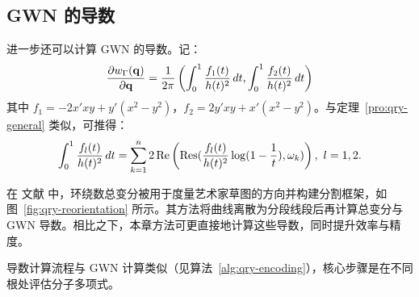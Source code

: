 \subsection{GWN 的导数}\label{sec:qry-derivative}
进一步还可以计算 GWN 的导数。记：
\begin{equation}
    \frac{\partial w_{\Gamma}(\mathbf{q})}{\partial \mathbf{q}}=\frac{1}{2 \pi} \left(\int_0^1\frac{f_1(t)}{h(t)^2}\,dt,\int_0^1\frac{f_2(t)}{h(t)^2}\,dt\right)
\end{equation}
其中 $f_1 =-2 x' x y +y' (x ^2-y ^2)$，$f_2 =2y' x y +x' (x ^2-y ^2)$。与定理~\ref{pro:qry-general} 类似，可推得：
\begin{equation}
    \int_0^1\frac{f_l(t)}{h(t)^2}\,dt=\sum_{k=1}^n2\mathop{\mathrm{Re}}\left(\mathop{\mathrm{Res}}(\frac{f_l(t)}{h(t)^2}\log(1-\frac{1}{t}),\omega_k)\right),\  l=1,2.
\end{equation}

在 文献\cite{Scrivener2024WindingNF} 中，环绕数总变分被用于度量艺术家草图的方向并构建分割框架，如图~\ref{fig:qry-reorientation} 所示。其方法将曲线离散为分段线段后再计算总变分与 GWN 导数。相比之下，本章方法可更直接地计算这些导数，同时提升效率与精度。

导数计算流程与 GWN 计算类似（见算法~\ref{alg:qry-encoding}），核心步骤是在不同根处评估分子多项式。


\begin{algorithm}[t]
  \caption{WindingNumber\Bezier：计算任意 \Bezier 曲线的广义环绕数}\label{alg:qry-encoding}
  

\end{algorithm}

\begin{algorithm}[t]
  \caption{CalculateRoots：计算复系数多项式的根}\label{alg:qry-encoding2}
  
\end{algorithm}

